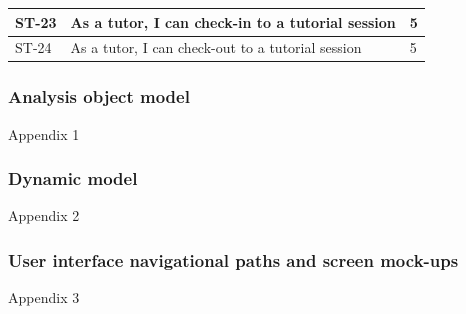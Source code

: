 \documentclass[12pt]{article}
\begin{document}
{{\begin{longtable}{| l | p{10cm}| l |}
			\\ \hline ST-23 & As a tutor, I can  check-in to a tutorial session  & 5 
			
			\\ \hline ST-24 & As a tutor, I can  check-out to a tutorial session  & 5 \\ \hline
\end{longtable}
}
		

\subsubsection{Analysis object model}
Appendix 1



\subsubsection{Dynamic model}
Appendix 2

	

 \subsubsection{User interface navigational paths and screen mock-ups}
 Appendix 3
 
}
\end{document}
